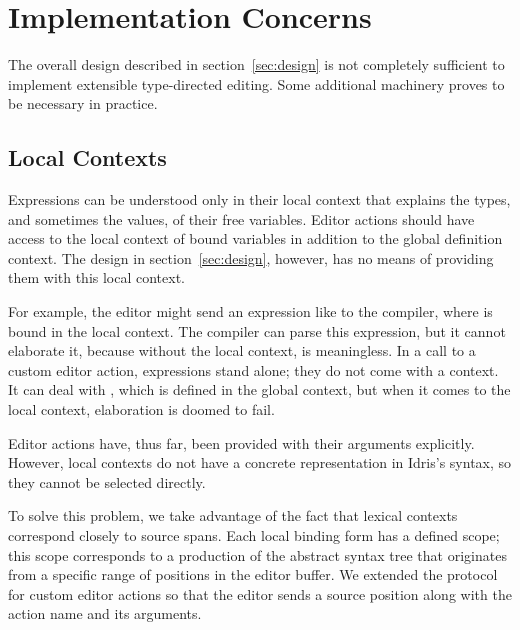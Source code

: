 \section{Implementation Concerns}\label{sec:implementation}


The overall design described in section~\ref{sec:design} is not
completely sufficient to implement extensible type-directed
editing. Some additional machinery proves to be necessary in practice.

\subsection{Local Contexts}
\label{ssec:localContext}

Expressions can be understood only in their local context that
explains the types, and sometimes the values, of their free
variables. Editor actions should have access to the local context of
bound variables in addition to the global definition context. The
design in section~\ref{sec:design}, however, has no means of providing
them with this local context.

For example, the editor might send an expression like  to the compiler, where  is bound in the local context.
The compiler can parse this expression, but it cannot elaborate it,
because without the local context,  is meaningless. In a call to
a custom editor action, expressions stand alone; they do not come with
a context. It can deal with , which is defined in the global
context, but when it comes to the local context, elaboration is doomed
to fail.

Editor actions have, thus far, been provided with their arguments
explicitly. However, local contexts do not have a concrete
representation in Idris's syntax, so they cannot be selected directly.

To solve this problem, we take advantage of the fact that lexical
contexts correspond closely to source spans. Each local binding form
has a defined scope; this scope corresponds to a production of the
abstract syntax tree that originates from a specific range of
positions in the editor buffer. We extended the protocol for custom
editor actions so that the editor sends a source position along with
the action name and its arguments.

